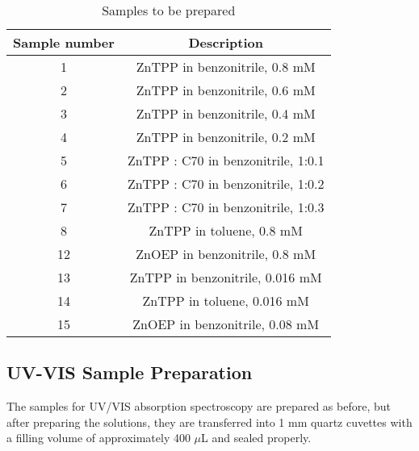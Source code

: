 \begin{table}[ht]
    \centering
    \begin{tabular}{c|c}
        \toprule
        Sample number & Description \\
        \midrule
        1 & ZnTPP in benzonitrile, 0.8 mM \\
        2 & ZnTPP in benzonitrile, 0.6 mM \\
        3 & ZnTPP in benzonitrile, 0.4 mM \\
        4 & ZnTPP in benzonitrile, 0.2 mM \\
        5 & ZnTPP : C70 in benzonitrile, 1:0.1 \\
        6 & ZnTPP : C70 in benzonitrile, 1:0.2 \\
        7 & ZnTPP : C70 in benzonitrile, 1:0.3 \\
        8 & ZnTPP in toluene, 0.8 mM \\
        12 & ZnOEP in benzonitrile, 0.8 mM \\
        13 & ZnTPP in benzonitrile, 0.016 mM \\
        14 & ZnTPP in toluene, 0.016 mM \\
        15 & ZnOEP in benzonitrile, 0.08 mM \\
        \bottomrule
    \end{tabular}
    \caption{Samples to be prepared}
    \label{tab:sample}
\end{table}

\subsection*{UV-VIS Sample Preparation}

The samples for UV/VIS absorption spectroscopy are prepared as before, but after preparing the solutions, they are 
transferred into 1 mm quartz cuvettes with a filling volume of approximately 400 $\mu$L and sealed properly.


